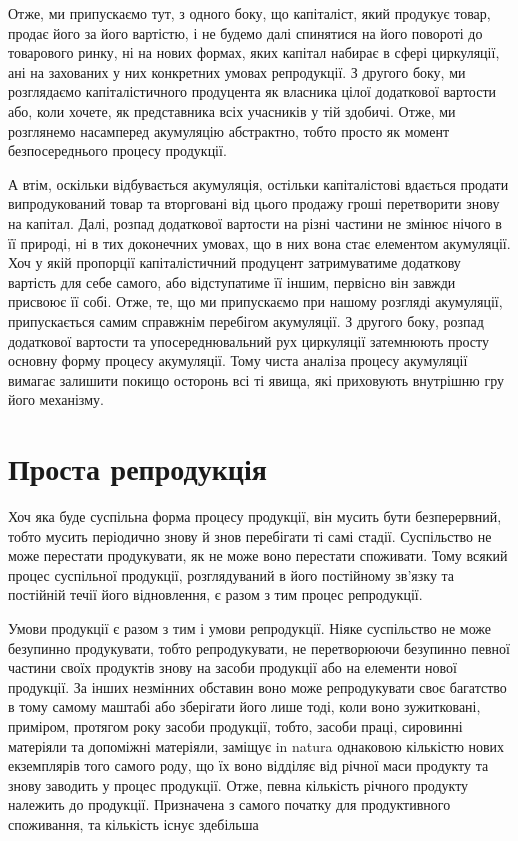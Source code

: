 
Отже, ми припускаємо тут, з одного боку, що капіталіст,
який продукує товар, продає його за його вартістю, і не будемо
далі спинятися на його повороті до товарового ринку, ні на
нових формах, яких капітал набирає в сфері циркуляції, ані на
захованих у них конкретних умовах репродукції. З другого боку,
ми розглядаємо капіталістичного продуцента як власника цілої
додаткової вартости або, коли хочете, як представника всіх учасників
у тій здобичі. Отже, ми розглянемо насамперед акумуляцію
абстрактно, тобто просто як момент безпосереднього процесу
продукції.

А втім, оскільки відбувається акумуляція, остільки капіталістові
вдається продати випродукований товар та вторговані
від цього продажу гроші перетворити знову на капітал. Далі,
розпад додаткової вартости на різні частини не змінює нічого в
її природі, ні в тих доконечних умовах, що в них вона стає елементом
акумуляції. Хоч у якій пропорції капіталістичний продуцент
затримуватиме додаткову вартість для себе самого, або
відступатиме її іншим, первісно він завжди присвоює її собі.
Отже, те, що ми припускаємо при нашому розгляді акумуляції,
припускається самим справжнім перебігом акумуляції. З другого
боку, розпад додаткової вартости та упосереднювальний рух циркуляції
затемнюють просту основну форму процесу акумуляції.
Тому чиста аналіза процесу акумуляції вимагає залишити покищо
осторонь всі ті явища, які приховують внутрішню гру його
механізму.

\section{Проста репродукція}

Хоч яка буде суспільна форма процесу продукції, він мусить
бути безперервний, тобто мусить періодично знову й знов перебігати
ті самі стадії. Суспільство не може перестати продукувати,
як не може воно перестати споживати. Тому всякий процес
суспільної продукції, розглядуваний в його постійному зв’язку
та постійній течії його відновлення, є разом з тим процес репродукції.

Умови продукції є разом з тим і умови репродукції. Ніяке
суспільство не може безупинно продукувати, тобто репродукувати,
не перетворюючи безупинно певної частини своїх продуктів
знову на засоби продукції або на елементи нової продукції.
За інших незмінних обставин воно може репродукувати своє багатство
в тому самому маштабі або зберігати його лише тоді, коли
воно зужитковані, приміром, протягом року засоби продукції,
тобто, засоби праці, сировинні матеріяли та допоміжні матеріяли,
заміщує in natura однаковою кількістю нових екземплярів того
самого роду, що їх воно відділяє від річної маси продукту та
знову заводить у процес продукції. Отже, певна кількість річного
продукту належить до продукції. Призначена з самого початку
для продуктивного споживання, та кількість існує здебільша
\parbreak{}  %
